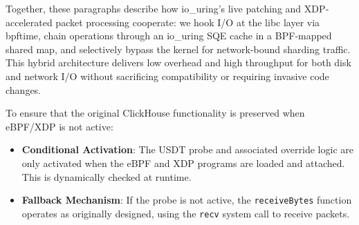 \documentclass[sigconf,10pt]{acmart}
\newcommand{\sys}{\textsc{Bur}\xspace}
\begin{document}
Together, these paragraphs describe how io\_uring’s live patching and XDP‐accelerated packet processing cooperate: we hook I/O at the libc layer via bpftime, chain operations through an io\_uring SQE cache in a BPF‐mapped shared map, and selectively bypass the kernel for network-bound sharding traffic. This hybrid architecture delivers low overhead and high throughput for both disk and network I/O without sacrificing compatibility or requiring invasive code changes.

To ensure that the original ClickHouse functionality is preserved when eBPF/XDP is not active:

\begin{itemize}[leftmargin=*,itemsep=0pt]
    \item \textbf{Conditional Activation}: The USDT probe and associated override logic are only activated when the eBPF and XDP programs are loaded and attached. This is dynamically checked at runtime.
    \item \textbf{Fallback Mechanism}: If the probe is not active, the \texttt{receiveBytes} function operates as originally designed, using the \texttt{recv} system call to receive packets.
\end{itemize}




\end{document}
